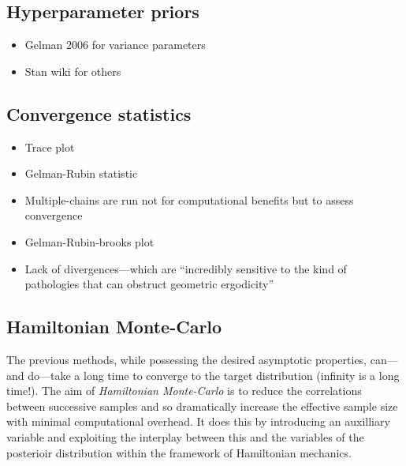 \documentclass[11pt]{report}
\begin{document}
\subsection{Hyperparameter priors}

\begin{itemize}

\item Gelman 2006 for variance parameters

\item Stan wiki for others

\end{itemize}

\subsection{Convergence statistics}

\begin{itemize}

\item Trace plot

\item Gelman-Rubin statistic

\item Multiple-chains are run not for computational benefits but to assess convergence

\item Gelman-Rubin-brooks plot

\item Lack of divergences---which are ``incredibly sensitive to the kind of pathologies that can obstruct geometric ergodicity'' 


\end{itemize}


\subsection{Hamiltonian Monte-Carlo}

The previous methods, while possessing the desired asymptotic properties, can---and do---take a long time to converge to the target distribution (infinity is a long time!). The aim of \emph{Hamiltonian Monte-Carlo} is to reduce the correlations between successive samples and so dramatically increase the effective sample size with minimal computational overhead. It does this by introducing an auxilliary variable and exploiting the interplay between this and the variables of the posterioir distribution within the framework of Hamiltonian mechanics.
\end{document}
